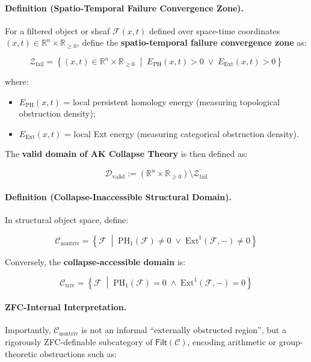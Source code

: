 \documentclass[11pt]{article}
\begin{document}
\paragraph{Definition (Spatio-Temporal Failure Convergence Zone).}

For a filtered object or sheaf $\mathcal{F}(x,t)$ defined over space-time coordinates $(x,t) \in \mathbb{R}^n \times \mathbb{R}_{\geq 0}$, define the \textbf{spatio-temporal failure convergence zone} as:

\[
\mathcal{Z}_{\mathrm{fail}} = \left\{ (x,t) \in \mathbb{R}^n \times \mathbb{R}_{\geq 0} \;\middle|\; E_{\mathrm{PH}}(x,t) > 0 \;\lor\; E_{\mathrm{Ext}}(x,t) > 0 \right\}
\]

where:

\begin{itemize}
    \item $E_{\mathrm{PH}}(x,t)$ = local persistent homology energy (measuring topological obstruction density);
    \item $E_{\mathrm{Ext}}(x,t)$ = local Ext energy (measuring categorical obstruction density).
\end{itemize}

The \textbf{valid domain of AK Collapse Theory} is then defined as:

\[
\mathcal{D}_{\mathrm{valid}} := \left( \mathbb{R}^n \times \mathbb{R}_{\geq 0} \right) \setminus \overline{\mathcal{Z}_{\mathrm{fail}}}
\]

\paragraph{Definition (Collapse-Inaccessible Structural Domain).}

In structural object space, define:

\[
\mathcal{C}_{\mathrm{nontriv}} = \left\{ \mathcal{F} \;\middle|\; \mathrm{PH}_1(\mathcal{F}) \neq 0 \;\lor\; \mathrm{Ext}^1(\mathcal{F}, -) \neq 0 \right\}
\]

Conversely, the \textbf{collapse-accessible domain} is:

\[
\mathcal{C}_{\mathrm{triv}} = \left\{ \mathcal{F} \;\middle|\; \mathrm{PH}_1(\mathcal{F}) = 0 \;\land\; \mathrm{Ext}^1(\mathcal{F}, -) = 0 \right\}
\]

\paragraph{ZFC-Internal Interpretation.}

Importantly, $\mathcal{C}_{\mathrm{nontriv}}$ is not an informal “externally obstructed region”, but a rigorously ZFC-definable subcategory of $\mathsf{Filt}(\mathcal{C})$, encoding arithmetic or group-theoretic obstructions such as:
\end{document}
